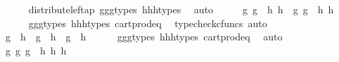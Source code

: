 \begin{isabellebody}
\ \ \ \ \isamarkupfalse%
\ distribute{\isacharunderscore}{\kern0pt}left{\isacharunderscore}{\kern0pt}ap\ g{}{\isacharunderscore}{\kern0pt}g{}{\isacharunderscore}{\kern0pt}g{}{\isacharunderscore}{\kern0pt}types\ h{}{\isacharunderscore}{\kern0pt}h{}{\isacharunderscore}{\kern0pt}h{}{\isacharunderscore}{\kern0pt}types\ \isamarkupfalse%
\ auto\isanewline
\ \ \isamarkupfalse%
\ \isamarkupfalse%
\ {\isachardoublequoteopen}{\isasymlangle}g{}{\isacharcomma}{\kern0pt}\ g{}{\isasymrangle}\ {\isacharequal}{\kern0pt}\ {\isasymlangle}h{}{\isacharcomma}{\kern0pt}\ h{}{\isasymrangle}\ {\isasymand}\ {\isasymlangle}g{}{\isacharcomma}{\kern0pt}\ g{}{\isasymrangle}\ {\isacharequal}{\kern0pt}\ {\isasymlangle}h{}{\isacharcomma}{\kern0pt}\ h{}{\isasymrangle}{\isachardoublequoteclose}\isanewline
\ \ \ \ \isamarkupfalse%
\ g{}{\isacharunderscore}{\kern0pt}g{}{\isacharunderscore}{\kern0pt}g{}{\isacharunderscore}{\kern0pt}types\ h{}{\isacharunderscore}{\kern0pt}h{}{\isacharunderscore}{\kern0pt}h{}{\isacharunderscore}{\kern0pt}types\ cart{\isacharunderscore}{\kern0pt}prod{\isacharunderscore}{\kern0pt}eq{}\ \isamarkupfalse%
\ {\isacharparenleft}{\kern0pt}typecheck{\isacharunderscore}{\kern0pt}cfuncs{\isacharcomma}{\kern0pt}\ auto{\isacharparenright}{\kern0pt}\isanewline
\ \ \isamarkupfalse%
\ \isamarkupfalse%
\ {\isachardoublequoteopen}g{}\ {\isacharequal}{\kern0pt}\ h{}\ {\isasymand}\ g{}\ {\isacharequal}{\kern0pt}\ h{}\ {\isasymand}\ g{}\ {\isacharequal}{\kern0pt}\ h{}{\isachardoublequoteclose}\isanewline
\ \ \ \ \isamarkupfalse%
\ g{}{\isacharunderscore}{\kern0pt}g{}{\isacharunderscore}{\kern0pt}g{}{\isacharunderscore}{\kern0pt}types\ h{}{\isacharunderscore}{\kern0pt}h{}{\isacharunderscore}{\kern0pt}h{}{\isacharunderscore}{\kern0pt}types\ cart{\isacharunderscore}{\kern0pt}prod{\isacharunderscore}{\kern0pt}eq{}\ \isamarkupfalse%
\ auto\isanewline
\ \ \isamarkupfalse%
\ \isamarkupfalse%
\ {\isachardoublequoteopen}{\isasymlangle}g{}{\isacharcomma}{\kern0pt}\ {\isasymlangle}g{}{\isacharcomma}{\kern0pt}\ g{}{\isasymrangle}{\isasymrangle}\ {\isacharequal}{\kern0pt}\ {\isasymlangle}h{}{\isacharcomma}{\kern0pt}\ {\isasymlangle}h{}{\isacharcomma}{\kern0pt}\ h{}{\isasymrangle}{\isasymrangle}{\isachardoublequoteclose}\isanewline

\end{isabellebody}
